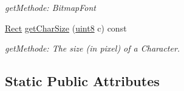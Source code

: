 \begin{DoxyCompactItemize}
\begin{DoxyCompactList}\small\item\em getMethode: BitmapFont \item\end{DoxyCompactList}\item 
\hyperlink{class_f2_c_1_1_rect}{Rect} \hyperlink{class_f2_c_1_1_t_t_f_font_ae9122df089408bb62dc4cdc99241afc1}{getCharSize} (\hyperlink{namespace_f2_c_a711deb33697d145669b9c0c4fe87c7ca}{uint8} c) const 
\begin{DoxyCompactList}\small\item\em getMethode: The size (in pixel) of a Character. \item\end{DoxyCompactList}\end{DoxyCompactItemize}
\subsection*{Static Public Attributes}

